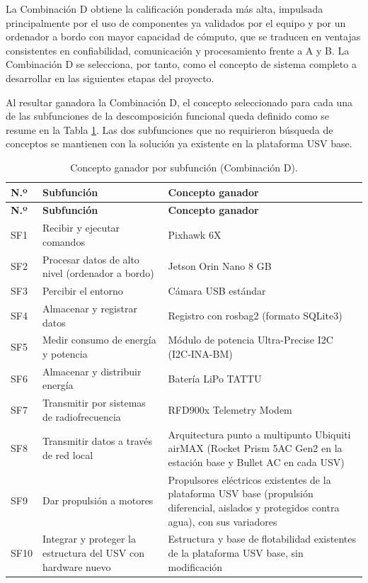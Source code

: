 La Combinación D obtiene la calificación ponderada más alta, impulsada principalmente
por el uso de componentes ya validados por el equipo y por un ordenador a bordo con
mayor capacidad de cómputo, que se traducen en ventajas consistentes en confiabilidad,
comunicación y procesamiento frente a A y B. La Combinación D se selecciona, por tanto,
como el concepto de sistema completo a desarrollar en las siguientes etapas del proyecto.

\newpage

Al resultar ganadora la Combinación D, el concepto seleccionado para cada una de las
subfunciones de la descomposición funcional queda definido como se resume en
la Tabla \ref{tab:concepto_ganador}. Las dos subfunciones que no requirieron búsqueda de conceptos se mantienen
con la solución ya existente en la plataforma USV base.

\begin{longtable}{|>{\centering\arraybackslash}p{1.1cm}|p{5.2cm}|p{7.2cm}|}
\caption{Concepto ganador por subfunción (Combinación D).}
\label{tab:concepto_ganador} \\
\hline
\textbf{N.º} & \textbf{Subfunción} & \textbf{Concepto ganador} \\
\hline
\endfirsthead
\hline
\textbf{N.º} & \textbf{Subfunción} & \textbf{Concepto ganador} \\
\hline
\endhead

SF1 & Recibir y ejecutar comandos & Pixhawk 6X \\ \hline
SF2 & Procesar datos de alto nivel (ordenador a bordo) & Jetson Orin Nano 8 GB \\ \hline
SF3 & Percibir el entorno & Cámara USB estándar \\ \hline
SF4 & Almacenar y registrar datos & Registro con rosbag2 (formato SQLite3) \\ \hline
SF5 & Medir consumo de energía y potencia & Módulo de potencia Ultra-Precise I2C (I2C-INA-BM) \\ \hline
SF6 & Almacenar y distribuir energía & Batería LiPo TATTU \\ \hline
SF7 & Transmitir por sistemas de radiofrecuencia & RFD900x Telemetry Modem \\ \hline
SF8 & Transmitir datos a través de red local & Arquitectura punto a multipunto Ubiquiti airMAX (Rocket Prism 5AC Gen2 en la estación base y Bullet AC en cada USV) \\ \hline
SF9 & Dar propulsión a motores & Propulsores eléctricos existentes de la plataforma USV base (propulsión diferencial, aislados y protegidos contra agua), con sus variadores \\ \hline
SF10 & Integrar y proteger la estructura del USV con hardware nuevo & Estructura y base de flotabilidad existentes de la plataforma USV base, sin modificación \\ \hline
\end{longtable}

